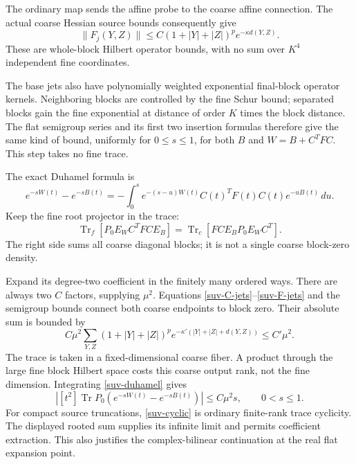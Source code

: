 \documentclass[11pt]{article}
\theoremstyle{remark}
\begin{document}
The ordinary map sends the affine probe to the coarse affine
connection. The actual coarse Hessian source bounds consequently give
\begin{equation}
 \|F_j(Y,Z)\|\le C(1+|Y|+|Z|)^p e^{-\kappa d(Y,Z)}.
 \label{suv-F-jets}
\end{equation}
These are whole-block Hilbert operator bounds, with no sum over
$K^4$ independent fine coordinates.

The base jets also have polynomially weighted exponential final-block
operator kernels. Neighboring blocks are controlled by the fine Schur
bound; separated blocks gain the fine exponential at distance of order
$K$ times the block distance. The flat semigroup series and its first
two insertion formulas therefore give the same kind of bound,
uniformly for $0\le s\le1$, for both $B$ and
$W=B+C^TFC$. This step takes no fine trace.

The exact Duhamel formula is
\begin{equation}
 e^{-sW(t)}-e^{-sB(t)}
   =-\int_0^s e^{-(s-u)W(t)}C(t)^TF(t)C(t)e^{-uB(t)}\,du.
 \label{suv-duhamel}
\end{equation}
Keep the fine root projector in the trace:
\begin{equation}
 \operatorname{Tr}_f[P_0 E_W C^TFC E_B]
       =\operatorname{Tr}_c[FC E_B P_0 E_W C^T].
 \label{suv-cyclic}
\end{equation}
The right side sums all coarse diagonal blocks; it is not a single
coarse block-zero density.

Expand its degree-two coefficient in the finitely many ordered ways.
There are always two $C$ factors, supplying $\mu^2$.
Equations \eqref{suv-C-jets}--\eqref{suv-F-jets} and the semigroup
bounds connect both coarse endpoints to block zero. Their absolute
sum is bounded by
\[
 C\mu^2\sum_{Y,Z}(1+|Y|+|Z|)^p
       e^{-\kappa'(|Y|+|Z|+d(Y,Z))}\le C'\mu^2.
\]
The trace is taken in a fixed-dimensional coarse fiber. A product
through the large fine block Hilbert space costs this coarse output
rank, not the fine dimension. Integrating \eqref{suv-duhamel} gives
\begin{equation}
 \left|[t^2]\operatorname{Tr}
       P_0(e^{-sW(t)}-e^{-sB(t)})\right|
          \le C\mu^2s,\qquad 0<s\le1.
 \label{suv-correction-bound}
\end{equation}
For compact source truncations, \eqref{suv-cyclic} is ordinary
finite-rank trace cyclicity. The displayed rooted sum supplies its
infinite limit and permits coefficient extraction. This also justifies
the complex-bilinear continuation at the real flat expansion point.
\end{document}

